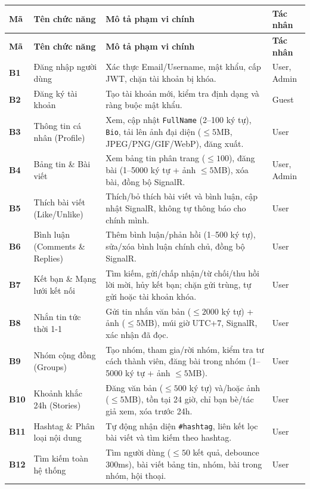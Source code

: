 \documentclass[11pt,a4paper]{article}
\begin{document}
\begin{longtable}{|C{1.1cm}|L{4.3cm}|L{8.4cm}|C{2.0cm}|}
\hline
{}
\textbf{Mã} & \textbf{Tên chức năng} & \textbf{Mô tả phạm vi chính} & \textbf{Tác nhân} \tabularnewline
\hline
\endfirsthead
\hline
{}
\textbf{Mã} & \textbf{Tên chức năng} & \textbf{Mô tả phạm vi chính} & \textbf{Tác nhân} \tabularnewline
\hline
\endhead
\hline
\endfoot
\textbf{B1} & Đăng nhập người dùng & Xác thực Email/Username, mật khẩu, cấp JWT, chặn tài khoản bị khóa. & User, Admin \\ \hline
\textbf{B2} & Đăng ký tài khoản & Tạo tài khoản mới, kiểm tra định dạng và ràng buộc mật khẩu. & Guest \\ \hline
\textbf{B3} & Thông tin cá nhân (Profile) & Xem, cập nhật \texttt{FullName} (2--100 ký tự), \texttt{Bio}, tải lên ảnh đại diện ($\le 5$MB, JPEG/PNG/GIF/WebP), đăng xuất. & User \\ \hline
\textbf{B4} & Bảng tin \& Bài viết & Xem bảng tin phân trang ($\le 100$), đăng bài (1--5000 ký tự + ảnh $\le 5$MB), xóa bài, đồng bộ SignalR. & User, Admin \\ \hline
\textbf{B5} & Thích bài viết (Like/Unlike) & Thích/bỏ thích bài viết và bình luận, cập nhật SignalR, không tự thông báo cho chính mình. & User \\ \hline
\textbf{B6} & Bình luận (Comments \& Replies) & Thêm bình luận/phản hồi (1--500 ký tự), sửa/xóa bình luận chính chủ, đồng bộ SignalR. & User \\ \hline
\textbf{B7} & Kết bạn \& Mạng lưới kết nối & Tìm kiếm, gửi/chấp nhận/từ chối/thu hồi lời mời, hủy kết bạn; chặn gửi trùng, tự gửi hoặc tài khoản khóa. & User \\ \hline
\textbf{B8} & Nhắn tin tức thời 1-1 & Gửi tin nhắn văn bản ($\le 2000$ ký tự) + ảnh ($\le 5$MB), múi giờ UTC+7, SignalR, xác nhận đã đọc. & User \\ \hline
\textbf{B9} & Nhóm cộng đồng (Groups) & Tạo nhóm, tham gia/rời nhóm, kiểm tra tư cách thành viên, đăng bài trong nhóm (1--5000 ký tự + ảnh $\le 5$MB). & User \\ \hline
\textbf{B10} & Khoảnh khắc 24h (Stories) & Đăng văn bản ($\le 500$ ký tự) và/hoặc ảnh ($\le 5$MB), tồn tại 24 giờ, chỉ bạn bè/tác giả xem, xóa trước 24h. & User \\ \hline
\textbf{B11} & Hashtag \& Phân loại nội dung & Tự động nhận diện \texttt{\#hashtag}, liên kết lọc bài viết và tìm kiếm theo hashtag. & User \\ \hline
\textbf{B12} & Tìm kiếm toàn hệ thống & Tìm người dùng ($\le 50$ kết quả, debounce 300ms), bài viết bảng tin, nhóm, bài trong nhóm, hội thoại. & User \\ \hline

\end{longtable}
\end{document}
